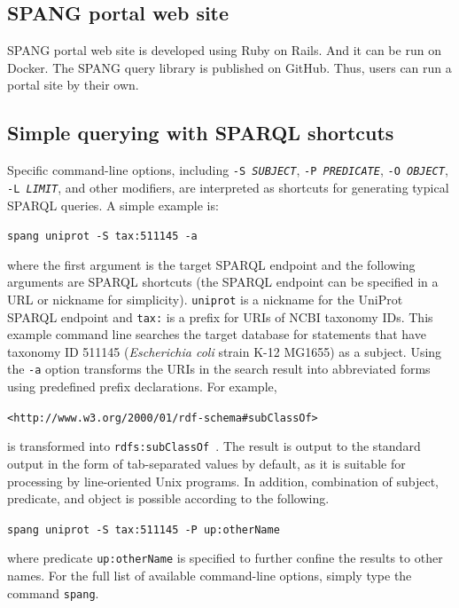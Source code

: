 \documentclass[runningheads]{llncs}
\begin{document}
\subsection{SPANG portal web site}
SPANG portal web site is developed using Ruby on Rails. And it can be run on Docker. The SPANG query library is published on GitHub. Thus, users can run a portal site by their own.


\subsection{Simple querying with SPARQL shortcuts}

Specific command-line options, including \texttt{-S~\textit{SUBJECT}}, \texttt{-P~\textit{PREDICATE}}, \texttt{-O~\textit{OBJECT}}, \texttt{-L~\textit{LIMIT}}, and other modifiers, 
are interpreted as shortcuts for generating typical SPARQL queries. 
A simple example is: 

\texttt{spang uniprot -S tax:511145 -a}

\noindent where the first argument is the target SPARQL endpoint and the following arguments are SPARQL shortcuts (the SPARQL endpoint can be specified in a URL or nickname for simplicity). 
\texttt{uniprot} is a nickname for the UniProt SPARQL endpoint \citep{UniProt} and \texttt{tax:} is a prefix for URIs of NCBI taxonomy IDs. 
This example command line searches the target database for statements that have taxonomy ID 511145 ({\it Escherichia coli} strain K-12 MG1655) as a subject. Using the \texttt{-a} option transforms the URIs in the
 search result into abbreviated forms using predefined prefix declarations. For example,
 
 \texttt{\textless http://www.w3.org/2000/01/rdf-schema\#subClassOf\textgreater} 
 
\noindent is transformed into \texttt{rdfs:subClassOf
}.
The result is output to the standard output in the form of tab-separated values by default, as it is suitable for processing by line-oriented Unix programs.
In addition, combination of subject, predicate, and object is possible according to the following.

\texttt{spang uniprot -S tax:511145 -P up:otherName}

\noindent where predicate {\tt up:otherName} is specified to further confine the results to other names. 
For the full list of available command-line options, simply type the command {\tt spang}.
\vspace*{-5pt}
\end{document}
